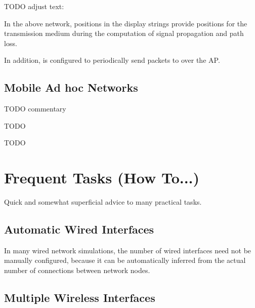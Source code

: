 
TODO adjust text: 

In the above network, positions in the display strings provide 
positions for the transmission medium during the computation of 
signal propagation and path loss. 

In addition,  is configured to periodically send
 packets to  over the AP.




\subsection{Mobile Ad hoc Networks}
\label{sec:networks:mobile-ad-hoc-networks}

TODO commentary


TODO


TODO



\section{Frequent Tasks (How To...)}
\label{sec:networks:frequent-tasks}

Quick and somewhat superficial advice to many practical tasks.

\subsection{Automatic Wired Interfaces}
\label{sec:networks:automatic-wired-interfaces}

In many wired network simulations, the number of wired interfaces need not
be manually configured, because it can be automatically inferred from the
actual number of connections between network nodes.


\subsection{Multiple Wireless Interfaces}
\label{sec:networks:multiple-wireless-interfaces}

